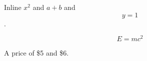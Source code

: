\documentclass[11pt]{article}
\date{\today}
\title{}
\begin{document}
\tableofcontents

Inline \(x^2\) and \(a+b\) and $$y=1$$.

\begin{equation}
E = mc^2
\end{equation}

A price of \$5 and \$6.
\end{document}
